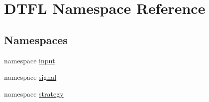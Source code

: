 \hypertarget{namespace_d_t_f_l}{}\section{D\+T\+FL Namespace Reference}
\label{namespace_d_t_f_l}
\subsection*{Namespaces}
\begin{DoxyCompactItemize}
\item 
namespace \hyperlink{namespace_d_t_f_l_1_1input}{input}
\item 
namespace \hyperlink{namespace_d_t_f_l_1_1signal}{signal}
\item 
namespace \hyperlink{namespace_d_t_f_l_1_1strategy}{strategy}
\end{DoxyCompactItemize}
